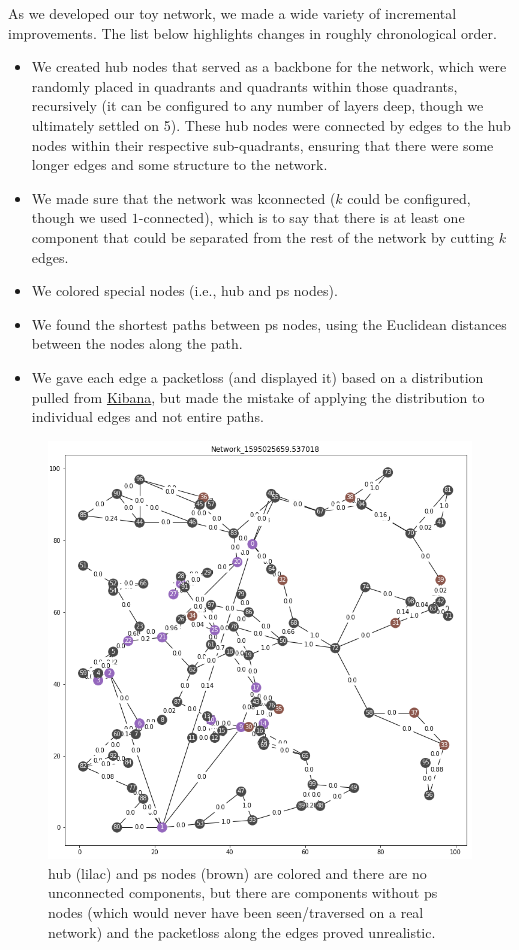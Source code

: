 \documentclass{finalreport}
\begin{document}
As we developed our toy network, we made a wide variety of incremental improvements. The list below highlights changes in roughly chronological order.

\begin{itemize}
    \item We created \gls{hub} nodes that served as a backbone for the network, which were randomly placed in quadrants and quadrants within those quadrants, recursively (it can be configured to any number of layers deep, though we ultimately settled on 5). These hub nodes were connected by edges to the hub nodes within their respective sub-quadrants, ensuring that there were some longer edges and some structure to the network.
    \item We made sure that the network was \gls{kconnected} ($k$ could be configured, though we used $1$-connected), which is to say that there is at least one \gls{component} that could be separated from the rest of the network by cutting $k$ edges.
    \item We colored special nodes (i.e., \gls{hub} and \gls{ps} nodes).
    \item We found the shortest paths between \gls{ps} nodes, using the Euclidean distances between the nodes along the path.
    \item We gave each edge a \gls{packetloss} (and displayed it) based on a distribution pulled from \hyperref[kibana]{Kibana}, but made the mistake of applying the distribution to individual edges and not entire paths.
\end{itemize}

\begin{figure}[!ht]
\centering
\includegraphics[width=.8\linewidth]{week_2/NetworkZero.png}
\caption{\Gls{hub} (lilac) and \gls{ps} nodes (brown) are colored and there are no unconnected \glspl{component}, but there are components without \gls{ps} nodes (which would never have been seen/traversed on a real network) and the \gls{packetloss} along the edges proved unrealistic.}
\end{figure}
\end{document}
